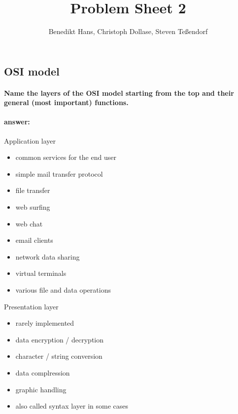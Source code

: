 \documentclass[a4paper,12pt]{article}
\author{Benedikt Hans, Christoph Dollase, Steven Te\ss endorf}
\title{ \textbf{Problem Sheet 2}}
\begin{document}
	 
 \maketitle	 
 
 \subsection{OSI model}
 \paragraph{Name the layers of the OSI model starting from the top and their general (most important) functions.}
 \paragraph{answer:}
\begin{itemize}
	\begin{minipage}[t]{0.48\linewidth}
		\item Application layer
		\begin{itemize}
			\item common services for the end user
			\item simple mail transfer protocol
			\item file transfer
			\item web surfing
			\item web chat
			\item email clients
			\item network data sharing
			\item virtual terminals
			\item various file and data operations 
		\end{itemize}
	\end{minipage}
	\hfill
	\begin{minipage}[t]{0.48\linewidth}
			\item Presentation layer
		\begin{itemize}
			\item  rarely implemented
			\item  data encryption / decryption
			\item  character / string conversion
			\item  data complression
			\item  graphic handling
			\item  also called syntax layer in some cases
		\end{itemize}
	\end{minipage}\\


\end{itemize}
\end{document}
